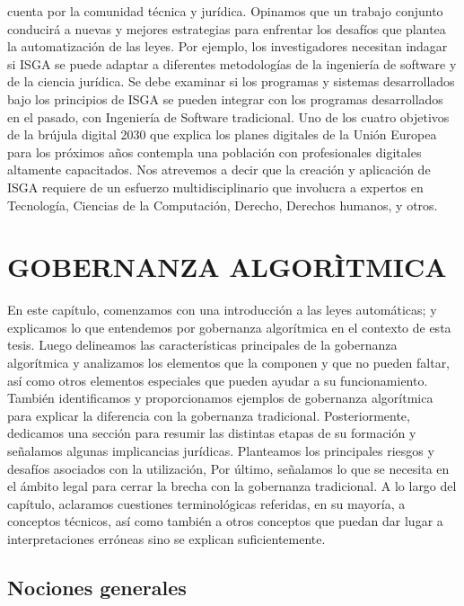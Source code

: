 \documentclass[12pt]{report} %
\begin{document}
cuenta por la comunidad técnica y jurídica. Opinamos que un trabajo conjunto conducirá a nuevas y mejores estrategias para enfrentar los desafíos que plantea la automatización de las leyes. Por ejemplo, los investigadores necesitan indagar si ISGA se puede adaptar a diferentes metodologías de la ingeniería de software y de la ciencia jurídica. Se debe examinar si los programas y sistemas desarrollados bajo los principios de ISGA se pueden integrar con los programas desarrollados en el pasado, con Ingeniería de Software tradicional. Uno de los cuatro objetivos de la brújula digital 2030  que explica los planes digitales de la Unión Europea para los próximos años contempla una población con profesionales digitales altamente capacitados. Nos atrevemos a decir que la creación y aplicación de ISGA requiere de un esfuerzo multidisciplinario que involucra a expertos en Tecnología, Ciencias de la Computación, Derecho, Derechos humanos, y otros.





\chapter{GOBERNANZA ALGORÌTMICA}
\label{goberalgoritmica}
En este capítulo, comenzamos con una introducción a las leyes automáticas; y explicamos lo que entendemos por gobernanza algorítmica en el contexto de esta tesis. Luego delineamos las características principales de la gobernanza algorítmica y analizamos los elementos que la componen y que no pueden faltar, así como otros elementos especiales que pueden ayudar a su funcionamiento. También identificamos y proporcionamos ejemplos de gobernanza algorítmica para explicar la diferencia con la gobernanza tradicional. Posteriormente, dedicamos una sección para resumir las distintas etapas de su formación y señalamos algunas implicancias jurídicas. Planteamos los principales riesgos y desafíos asociados con la utilización, Por último, señalamos lo que se necesita en el ámbito legal para cerrar la brecha con la gobernanza tradicional. 
A lo largo del capítulo, aclaramos cuestiones terminológicas referidas, en su mayoría, a conceptos técnicos, así como también a otros conceptos que puedan dar lugar a interpretaciones erróneas sino se explican suficientemente.

\section{Nociones generales}
\end{document}
